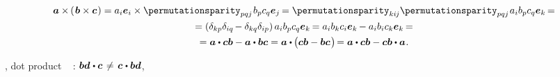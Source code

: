 \begin{otherlanguage}{russian}
\nopagebreak\vspace{-0.5em}\begin{multline}
\bm{a} \times \hspace{-0.15ex} \left(\hspace{.2ex}{\bm{b} \times \bm{c}}\hspace{.15ex}\right)
= a_i \bm{e}_i \times \permutationsparity_{pqj} \hspace{.2ex} b_p c_q \bm{e}_j \hspace{-0.2ex}
= \permutationsparity_{ki\hspace{-0.1ex}j} \permutationsparity_{pqj} \hspace{.2ex} a_i b_p c_q \bm{e}_k \hspace{-0.2ex} =
\\
= \left({\delta_{kp}\delta_{iq} \hspace{-0.2ex} - \delta_{kq}\delta_{ip}}\right) a_i b_p c_q \bm{e}_k \hspace{-0.2ex}
= a_i b_k c_i \bm{e}_k \hspace{-0.15ex} - a_i b_i c_k \bm{e}_k \hspace{-0.2ex} =
\\
= \bm{a} \dotp \bm{c} \bm{b} - \bm{a} \dotp \bm{b} \bm{c}
= \bm{a} \dotp \hspace{-0.1ex} \bigl( \bm{c} \bm{b} - \bm{b} \bm{c} \hspace{.15ex} \bigr) \hspace{-0.3ex}
= \bm{a} \dotp \bm{c} \bm{b} - \bm{c} \bm{b} \dotp \bm{a}
\hspace{.1ex} .
\end{multline}

\end{otherlanguage}

\vspace{-0.1em}\noindent
{}, dot product  ~ :\ru{\hspace{.2ex}}
${\bm{b} \bm{d} \hspace{.1ex} \dotp \bm{c} \hspace{.25ex} \neq \hspace{.25ex} \bm{c} \hspace{.1ex} \dotp \bm{b} \bm{d}}$,
~ 

